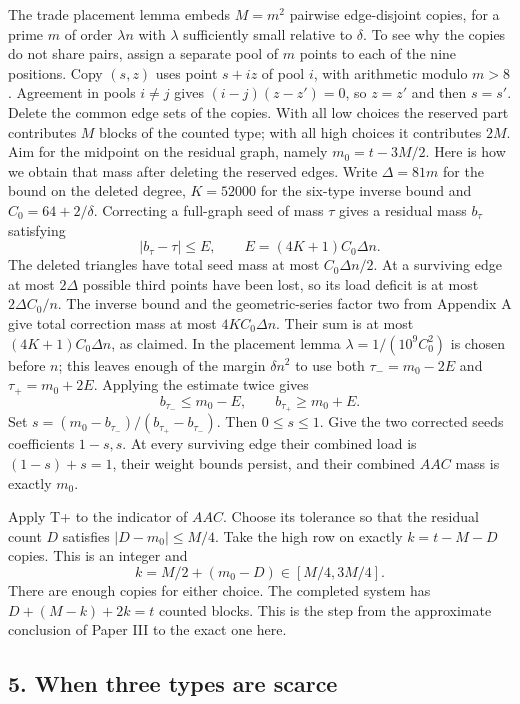 \documentclass[english,11pt,a4paper]{article}
\begin{document}
The trade placement lemma embeds \(M=m^2\) pairwise edge-disjoint copies, for a prime \(m\) of order \(\lambda n\) with \(\lambda\) sufficiently small relative to \(\delta\). To see why the copies do not share pairs, assign a separate pool of \(m\) points to each of the nine positions. Copy \((s,z)\) uses point \(s+iz\) of pool \(i\), with arithmetic modulo \(m>8\). Agreement in pools \(i\ne j\) gives \((i-j)(z-z')=0\), so \(z=z'\) and then \(s=s'\). Delete the common edge sets of the copies. With all low choices the reserved part contributes \(M\) blocks of the counted type; with all high choices it contributes \(2M\). Aim for the midpoint on the residual graph, namely \(m_0=t-3M/2\). Here is how we obtain that mass after deleting the reserved edges. Write \(\Delta=81m\) for the bound on the deleted degree, \(K=52000\) for the six-type inverse bound and \(C_0=64+2/\delta\). Correcting a full-graph seed of mass \(\tau\) gives a residual mass \(b_\tau\) satisfying \[|b_\tau-\tau|\le E,\qquad E=(4K+1)C_0\Delta n.\] The deleted triangles have total seed mass at most \(C_0\Delta n/2\). At a surviving edge at most \(2\Delta\) possible third points have been lost, so its load deficit is at most \(2\Delta C_0/n\). The inverse bound and the geometric-series factor two from Appendix A give total correction mass at most \(4KC_0\Delta n\). Their sum is at most \((4K+1)C_0\Delta n\), as claimed. In the placement lemma \(\lambda=1/(10^9 C_0^2)\) is chosen before \(n\); this leaves enough of the margin \(\delta n^2\) to use both \(\tau_-=m_0-2E\) and \(\tau_+=m_0+2E\). Applying the estimate twice gives \[b_{\tau_-}\le m_0-E,\qquad b_{\tau_+}\ge m_0+E.\] Set \(s=(m_0-b_{\tau_-})/(b_{\tau_+}-b_{\tau_-})\). Then \(0\le s\le1\). Give the two corrected seeds coefficients \(1-s,s\). At every surviving edge their combined load is \((1-s)+s=1\), their weight bounds persist, and their combined \(AAC\) mass is exactly \(m_0\).

Apply T+ to the indicator of \(AAC\). Choose its tolerance so that the residual count \(D\) satisfies \(|D-m_0|\le M/4\). Take the high row on exactly \(k=t-M-D\) copies. This is an integer and \[k=M/2+(m_0-D)\in[M/4,3M/4].\] There are enough copies for either choice. The completed system has \(D+(M-k)+2k=t\) counted blocks. This is the step from the approximate conclusion of Paper III to the exact one here.

\subsection{5. When three types are scarce}\label{when-three-types-are-scarce}
\end{document}
